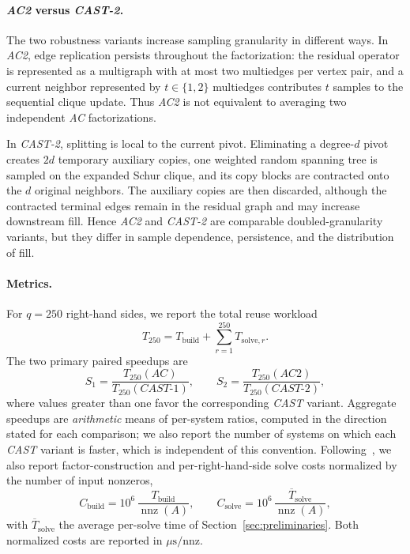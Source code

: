 \documentclass{article}
\newcommand{\CAST}{\textit{CAST}\xspace}
\newcommand{\CASTone}{\textit{CAST-1}\xspace}
\newcommand{\CASTtwo}{\textit{CAST-2}\xspace}
\newcommand{\AC}{\textit{AC}\xspace}
\newcommand{\ACtwo}{\textit{AC2}\xspace}
\newcommand{\1}{\mathbbm{1}}
\theoremstyle{plain}
\begin{document}
\paragraph{\ACtwo{} versus \CASTtwo{}.}
The two robustness variants increase sampling granularity in
different ways. In \ACtwo{}, edge replication persists throughout the
factorization: the residual operator is represented as a multigraph
with at most two multiedges per vertex pair, and a current neighbor
represented by $t\in\{1,2\}$ multiedges contributes $t$ samples to the
sequential clique update. Thus \ACtwo{} is not equivalent to
averaging two independent \AC{} factorizations.

In \CASTtwo{}, splitting is local to the current pivot. Eliminating a
degree-$d$ pivot creates $2d$ temporary auxiliary copies, one weighted
random spanning tree is sampled on the expanded Schur clique, and its
copy blocks are contracted onto the $d$ original neighbors. The
auxiliary copies are then discarded, although the contracted terminal
edges remain in the residual graph and may increase downstream fill.
Hence \ACtwo{} and \CASTtwo{} are comparable doubled-granularity
variants, but they differ in sample dependence, persistence, and the
distribution of fill.

\paragraph{Metrics.}
For $q=250$ right-hand sides, we report the total reuse workload
\[
T_{250} = T_{\mathrm{build}} + \sum_{r=1}^{250}T_{\mathrm{solve},r}.
\]
The two primary paired speedups are
\[
S_1 = \frac{T_{250}(\AC)}{T_{250}(\CASTone)},
\qquad
S_2 = \frac{T_{250}(\ACtwo)}{T_{250}(\CASTtwo)},
\]
where values greater than one favor the corresponding \CAST{}
variant. Aggregate speedups are \emph{arithmetic} means of per-system
ratios, computed in the direction stated for each comparison; we also
report the number of systems on which each \CAST{} variant is faster,
which is independent of this convention.
Following~\cite{AC}, we also report factor-construction and
per-right-hand-side solve costs normalized by the number of input
non\-zeros,
\[
C_{\mathrm{build}} = 10^6\,
\frac{T_{\mathrm{build}}}{\operatorname{nnz}(A)},
\qquad
C_{\mathrm{solve}} = 10^6\,
\frac{\overline T_{\mathrm{solve}}}{\operatorname{nnz}(A)},
\]
with $\overline T_{\mathrm{solve}}$ the average per-solve time of
Section~\ref{sec:preliminaries}. Both normalized costs are reported in
$\mu\mathrm{s}/\mathrm{nnz}$.
\end{document}
